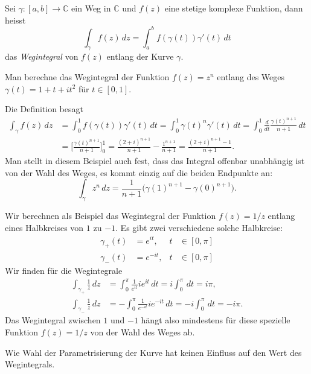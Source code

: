 \begin{definition}
Sei $\gamma\colon[a,b]\to\mathbb C$ ein Weg in $\mathbb C$ und $f(z)$
eine stetige komplexe Funktion, dann heisst
\[
\int_{\gamma} f(z)\,dz = \int_a^bf(\gamma(t)) \gamma'(t)\,dt
\]
das {\em Wegintegral} von $f(z)$ entlang der Kurve $\gamma$.
\end{definition}

\begin{beispiel}
Man berechne das Wegintegral der Funktion $f(z)=z^n$ entlang des
Weges
$\gamma(t)=1+t+it^2$
für $t\in[0,1]$.

Die Definition besagt
\begin{align*}
\int_\gamma f(z)\,dz
&=
\int_0^1 f(\gamma(t))\gamma'(t)\,dt
=
\int_0^1 \gamma(t)^n \gamma'(t)\,dt
=
\int_0^1 \frac{d}{dt}\frac{\gamma(t)^{n+1}}{n+1}\,dt
\\
&=
\biggl[\frac{\gamma(t)^{n+1}}{n+1}\biggr]_0^1
=
\frac{(2+i)^{n+1}}{n+1}-\frac{1^{n+1}}{n+1}
=
\frac{(2+i)^{n+1}-1}{n+1}.
\end{align*}
Man stellt in diesem Beispiel auch fest, dass das Integral offenbar
unabhängig ist von der Wahl des Weges, es kommt einzig auf die
beiden Endpunkte an:
\[
\int_\gamma z^n \,dz = \frac1{n+1}\bigl(\gamma(1)^{n+1}-\gamma(0)^{n+1}\bigr).
\]
\end{beispiel}

\begin{beispiel}
Wir berechnen als Beispiel das Wegintegral der Funktion $f(z)=1/z$ entlang
eines Halbkreises von $1$ zu $-1$.
Es gibt zwei verschiedene solche Halbkreise:
\begin{equation*}
\begin{aligned}
\gamma_+(t)&=e^{it},&t&\in[0,\pi]
\\
\gamma_-(t)&=e^{-it},&t&\in[0,\pi]
\end{aligned}
\end{equation*}
Wir finden für die Wegintegrale
\begin{align*}
\int_{\gamma_+}\frac1z\,dz
&=
\int_0^\pi \frac1{e^{it}}ie^{it}\,dt=i\int_0^\pi\,dt=i\pi,
\\
\int_{\gamma_-}\frac1z\,dz
&=
-\int_0^\pi \frac1{e^{-it}}ie^{-it}\,dt=-i\int_0^\pi\,dt=-i\pi.
\end{align*}
Das Wegintegral zwischen $1$ und $-1$ hängt also mindestens für diese
spezielle Funktion $f(z)=1/z$ von der Wahl des Weges ab.
\end{beispiel}

Wie Wahl der Parametrisierung der Kurve hat keinen Einfluss auf den
Wert des Wegintegrals.

